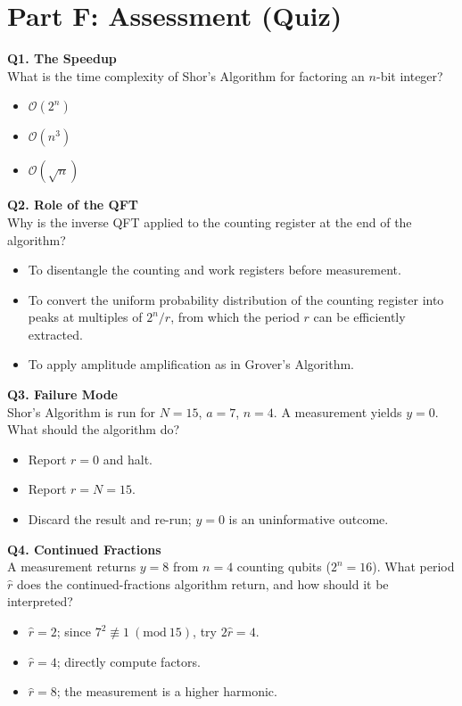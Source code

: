 \documentclass[a4paper,11pt]{article}
\newcommand{\Mod}[1]{\ (\mathrm{mod}\ #1)}
\begin{document}
\section{Part F: Assessment (Quiz)}

\textbf{Q1. The Speedup}\\
What is the time complexity of Shor's Algorithm for factoring an $n$-bit integer?
\begin{itemize}
    \item[A)] $\mathcal{O}(2^n)$
    \item[B)] $\mathcal{O}(n^3)$
    \item[C)] $\mathcal{O}(\sqrt{n})$
\end{itemize}

\vspace{0.3cm}
\textbf{Q2. Role of the QFT}\\
Why is the inverse QFT applied to the counting register at the end of the algorithm?
\begin{itemize}
    \item[A)] To disentangle the counting and work registers before measurement.
    \item[B)] To convert the uniform probability distribution of the counting
              register into peaks at multiples of $2^n / r$, from which the
              period $r$ can be efficiently extracted.
    \item[C)] To apply amplitude amplification as in Grover's Algorithm.
\end{itemize}

\vspace{0.3cm}
\textbf{Q3. Failure Mode}\\
Shor's Algorithm is run for $N=15$, $a=7$, $n=4$. A measurement yields $y=0$.
What should the algorithm do?
\begin{itemize}
    \item[A)] Report $r=0$ and halt.
    \item[B)] Report $r=N=15$.
    \item[C)] Discard the result and re-run; $y=0$ is an uninformative outcome.
\end{itemize}

\vspace{0.3cm}
\textbf{Q4. Continued Fractions}\\
A measurement returns $y=8$ from $n=4$ counting qubits ($2^n=16$).
What period $\hat{r}$ does the continued-fractions algorithm return, and
how should it be interpreted?
\begin{itemize}
    \item[A)] $\hat{r} = 2$; since $7^2 \not\equiv 1 \Mod{15}$, try $2\hat{r} = 4$.
    \item[B)] $\hat{r} = 4$; directly compute factors.
    \item[C)] $\hat{r} = 8$; the measurement is a higher harmonic.
\end{itemize}
\end{document}
